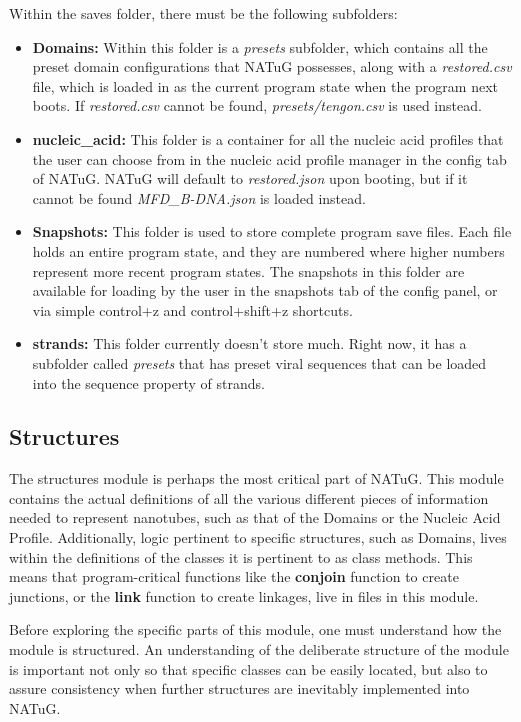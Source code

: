 \documentclass[titlepage]{article}
\begin{document}
	Within the saves folder, there must be the following subfolders:
	\begin{itemize}
		\item \textbf{Domains:} Within this folder is a \textit{presets} subfolder, which contains all the preset domain configurations that NATuG possesses, along with a \textit{restored.csv} file, which is loaded in as the current program state when the program next boots. If \textit{restored.csv} cannot be found, \textit{presets/tengon.csv} is used instead.
		
		\item \textbf{nucleic\_acid:} This folder is a container for all the nucleic acid profiles that the user can choose from in the nucleic acid profile manager in the config tab of NATuG. NATuG will default to \textit{restored.json} upon booting, but if it cannot be found \textit{MFD\_B-DNA.json} is loaded instead.
		
		\item \textbf{Snapshots:} This folder is used to store complete program save files. Each file holds an entire program state, and they are numbered where higher numbers represent more recent program states. The snapshots in this folder are available for loading by the user in the snapshots tab of the config panel, or via simple control+z and control+shift+z shortcuts.
		
		\item \textbf{strands:} This folder currently doesn't store much. Right now, it has a subfolder called \textit{presets} that has preset viral sequences that can be loaded into the sequence property of strands. 
	\end{itemize}
	
	\subsection{Structures}
	The structures module is perhaps the most critical part of NATuG. This module contains the actual definitions of all the various different pieces of information needed to represent nanotubes, such as that of the Domains or the Nucleic Acid Profile. Additionally, logic pertinent to specific structures, such as Domains, lives within the definitions of the classes it is pertinent to as class methods. This means that program-critical functions like the \textbf{conjoin} function to create junctions, or the \textbf{link} function to create linkages, live in files in this module.
	
	Before exploring the specific parts of this module, one must understand how the module is structured. An understanding of the deliberate structure of the module is important not only so that specific classes can be easily located, but also to assure consistency when further structures are inevitably implemented into NATuG.
	
\end{document}
